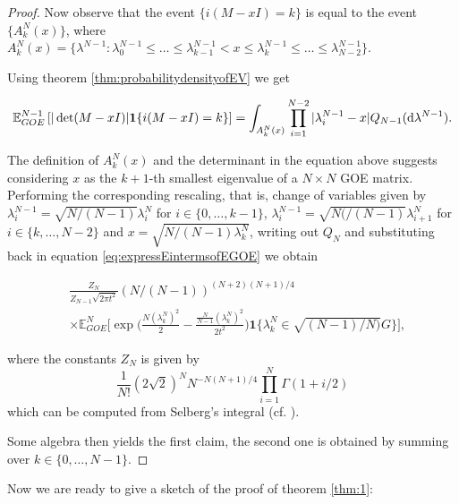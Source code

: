 \begin{proof}
Now observe that the event $\{i(M-xI)=k\}$ is equal to the event $\{A_k^N(x)\}$, where $A_k^N(x) = \{\lambda^{N-1}: \lambda_0^{N-1}\leq\dots\leq\lambda_{k-1}^{N-1}<x\leq\lambda_k^{N-1}\leq\dots\leq\lambda_{N-2}^{N-1}\}$.

Using theorem \ref{thm:probabilitydensityofEV} we get

\begin{equation*}
	\mathbb E_{GOE}^{N-1}\left[|\det(M-xI)|\mathbf 1\{i(M-xI)=k\}\right]=\int_{A_k^N(x)}\prod_{i=1}^{N-2}|\lambda_i^{N-1}-x|Q_{N-1}(\mathop{}\!\mathrm{d}\lambda^{N-1}).
\end{equation*}

The definition of $A_k^N(x)$ and the determinant in the equation above suggests considering $x$ as the $k+1$-th smallest eigenvalue of a $N\times N$ GOE matrix. Performing the corresponding rescaling, that is, change of variables given by $\lambda_i^{N-1}=\sqrt{N/(N-1)}\lambda_i^N$ for $i\in\{0,\dots,k-1\}$, $\lambda_i^{N-1}=\sqrt{N(/(N-1)}\lambda_{i+1}^N$ for $i\in\{k,\dots,N-2\}$ and $x=\sqrt{N/(N-1)\lambda_k^N}$, writing out $Q_N$ and substituting back in equation \eqref{eq:expressEintermsofEGOE} we obtain

\begin{align*}
	&\frac{Z_N}{Z_{N-1}\sqrt{2\pi t^2}}(N/(N-1))^{(N+2)(N+1)/4}\\
	&\times\mathbb E_{GOE}^N\Big[\exp\Big(\frac{N(\lambda_k^N)^2}{2}-\frac{\frac{N}{N-1}(\lambda_k^N)^2}{2t^2}\Big)\mathbf 1\{\lambda_k^N\in\sqrt{(N-1)/N)}G\}\Big],
\end{align*}

where the constants $Z_N$ is given by $$\frac{1}{N!}(2\sqrt 2)^N N^{-N(N+1)/4}\prod_{i=1}^N \Gamma(1+i/2)$$ which can be computed from Selberg's integral (cf. \cite{Mehta2004random}).

Some algebra then yields the first claim, the second one is obtained by summing over $k\in\{0,\dots,N-1\}$.

\end{proof}

Now we are ready to give a sketch of the proof of theorem \ref{thm:1}:

